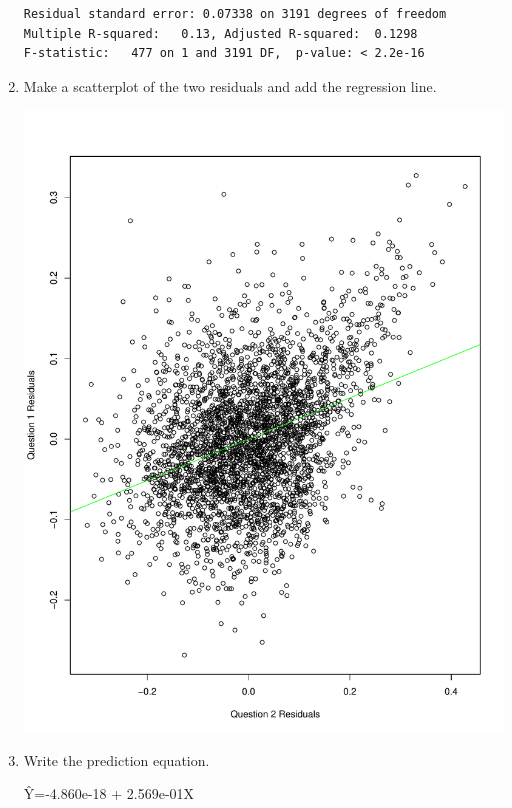 \documentclass[12pt,letterpaper]{article}
\begin{document}
\begin{enumerate}
\begin{Verbatim}
Residual standard error: 0.07338 on 3191 degrees of freedom
Multiple R-squared:   0.13,	Adjusted R-squared:  0.1298 
F-statistic:   477 on 1 and 3191 DF,  p-value: < 2.2e-16
		\end{Verbatim}
		\item Make a scatterplot of the two residuals and add the regression line.
		
		\includegraphics[scale=0.6]{Question 4.2.pdf}
		\item Write the prediction equation.
		
		\^{Y}=-4.860e-18 + 2.569e-01X
	\end{enumerate}
	
	\newpage	
\end{document}

